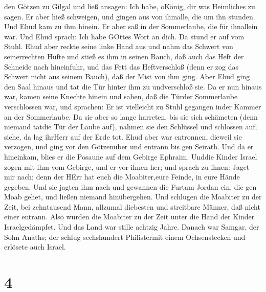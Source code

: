 den Götzen zu Gilgal und ließ ansagen: Ich habe, oKönig, dir was
Heimliches zu sagen. Er aber hieß schweigen, und gingen aus von ihmalle,
die um ihn stunden.  Und Ehud kam zu ihm hinein. Er aber
saß in der Sommerlaube, die für ihnallein war. Und Ehud sprach: Ich habe
GOttes Wort an dich. Da stund er auf vom Stuhl.  Ehud aber
reckte seine linke Hand aus und nahm das Schwert von seinerrechten Hüfte
und stieß es ihm in seinen Bauch,  daß auch das Heft der
Schneide nach hineinfuhr, und das Fett das Heftverschloß (denn er zog
das Schwert nicht aus seinem Bauch), daß der Mist von ihm ging.
 Aber Ehud ging den Saal hinaus und tat die Tür hinter ihm
zu undverschloß sie.  Da er nun hinaus war, kamen seine
Knechte hinein und sahen, daß die Türder Sommerlaube verschlossen war,
und sprachen: Er ist vielleicht zu Stuhl gegangen inder Kammer an der
Sommerlaube.  Da sie aber so lange harreten, bis sie sich
schämeten (denn niemand tatdie Tür der Laube auf), nahmen sie den
Schlüssel und schlossen auf; siehe, da lag ihrHerr auf der Erde tot.
 Ehud aber war entronnen, dieweil sie verzogen, und ging
vor den Götzenüber und entrann bis gen Seirath.  Und da er
hineinkam, blies er die Posaune auf dem Gebirge Ephraim. Unddie Kinder
Israel zogen mit ihm vom Gebirge, und er vor ihnen her; 
und sprach zu ihnen: Jaget mir nach; denn der HErr hat euch die
Moabiter,eure Feinde, in eure Hände gegeben. Und sie jagten ihm nach und
gewannen die Furtam Jordan ein, die gen Moab gehet, und ließen niemand
hinübergehen.  Und schlugen die Moabiter zu der Zeit, bei
zehntausend Mann, allzumal diebesten und streitbare Männer, daß nicht
einer entrann.  Also wurden die Moabiter zu der Zeit unter
die Hand der Kinder Israelgedämpfet. Und das Land war stille achtzig
Jahre.  Danach war Samgar, der Sohn Anaths; der schlug
sechshundert Philistermit einem Ochsenstecken und erlösete auch Israel.

\hypertarget{section-3}{%
\section{4}\label{section-3}}

